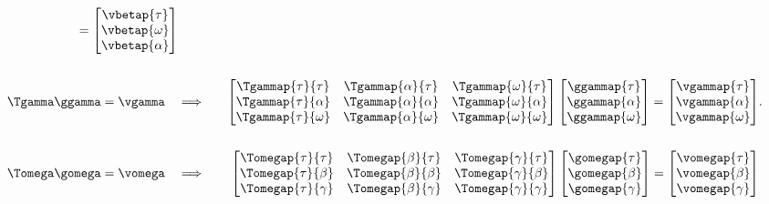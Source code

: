 \begin{equation}
\begin{aligned}
    =
    \begin{bmatrix}
        \vbetap{\tau} \\
        \vbetap{\omega} \\
        \vbetap{\alpha} \\
    \end{bmatrix} \\
&& \\
\Tgamma \ggamma = \vgamma \quad & \Longrightarrow  & \quad
    \begin{bmatrix}
        \Tgammap{\tau}{\tau}    & \Tgammap{\alpha}{\tau}   & \Tgammap{\omega}{\tau} \\
        \Tgammap{\tau}{\alpha}  & \Tgammap{\alpha}{\alpha} & \Tgammap{\omega}{\alpha} \\
        \Tgammap{\tau}{\omega}  & \Tgammap{\alpha}{\omega} & \Tgammap{\omega}{\omega} \\
    \end{bmatrix}
    \begin{bmatrix}
        \ggammap{\tau} \\
        \ggammap{\alpha} \\
        \ggammap{\omega} \\
    \end{bmatrix}
    =
    \begin{bmatrix}
        \vgammap{\tau} \\
        \vgammap{\alpha} \\
        \vgammap{\omega} \\
    \end{bmatrix} \\
&& \\    
\Tomega \gomega = \vomega \quad & \Longrightarrow  & \quad
    \begin{bmatrix}
        \Tomegap{\tau}{\tau}   & \Tomegap{\beta}{\tau}   & \Tomegap{\gamma}{\tau} \\
        \Tomegap{\tau}{\beta}  & \Tomegap{\beta}{\beta}  & \Tomegap{\gamma}{\beta} \\
        \Tomegap{\tau}{\gamma} & \Tomegap{\beta}{\gamma} & \Tomegap{\gamma}{\gamma} \\
    \end{bmatrix}
    \begin{bmatrix}
        \gomegap{\tau} \\
        \gomegap{\beta} \\
        \gomegap{\gamma} \\
    \end{bmatrix}
    =
    \begin{bmatrix}
        \vomegap{\tau} \\
        \vomegap{\beta} \\
        \vomegap{\gamma} \\
    \end{bmatrix}
\end{aligned}.
\label{eq:linalg_one}
\end{equation}

